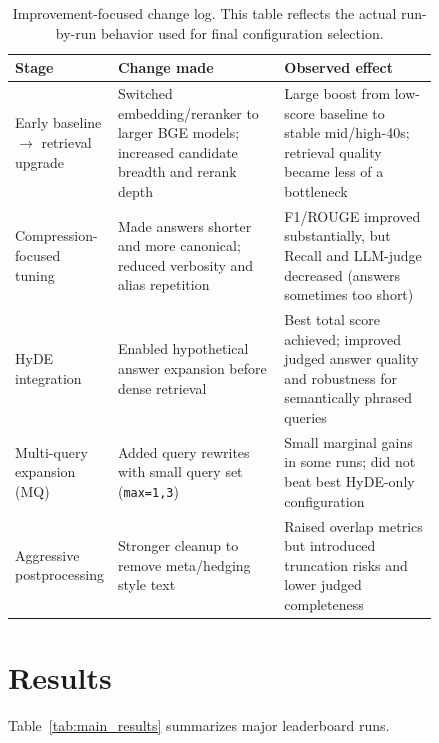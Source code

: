 \documentclass[11pt,twocolumn]{article}
\begin{document}
\begin{table}[t]
\centering
\small
\begin{tabular}{l p{0.42\linewidth} p{0.42\linewidth}}
\toprule
\textbf{Stage} & \textbf{Change made} & \textbf{Observed effect} \\
\midrule
Early baseline $\rightarrow$ retrieval upgrade &
Switched embedding/reranker to larger BGE models; increased candidate breadth and rerank depth &
Large boost from low-score baseline to stable mid/high-40s; retrieval quality became less of a bottleneck \\
\addlinespace
Compression-focused tuning &
Made answers shorter and more canonical; reduced verbosity and alias repetition &
F1/ROUGE improved substantially, but Recall and LLM-judge decreased (answers sometimes too short) \\
\addlinespace
HyDE integration &
Enabled hypothetical answer expansion before dense retrieval &
Best total score achieved; improved judged answer quality and robustness for semantically phrased queries \\
\addlinespace
Multi-query expansion (MQ) &
Added query rewrites with small query set (\texttt{max=1,3}) &
Small marginal gains in some runs; did not beat best HyDE-only configuration \\
\addlinespace
Aggressive postprocessing &
Stronger cleanup to remove meta/hedging style text &
Raised overlap metrics but introduced truncation risks and lower judged completeness \\
\bottomrule
\end{tabular}
\caption{Improvement-focused change log. This table reflects the actual run-by-run behavior used for final configuration selection.}
\label{tab:change_log}
\end{table}

\section{Results}
Table~\ref{tab:main_results} summarizes major leaderboard runs.
\end{document}
